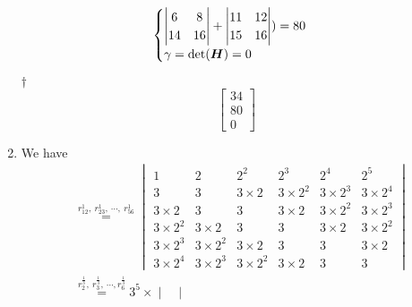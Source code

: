 \documentclass[a4paper,12pt]{article}
\begin{document}
\begin{enumerate}
\begin{equation}
\begin{aligned}
\begin{cases}
\begin{aligned}
\begin{vmatrix}
                    6 & 8 \\
                    14 & 16
                \end{vmatrix} + \begin{vmatrix}
                    11 & 12 \\
                    15 & 16
                \end{vmatrix}) = 80 \end{aligned} \\
                \gamma = \det(\boldsymbol{H}) = 0
            \end{cases}
        \end{aligned}
    \end{equation}
    \begin{answer}{$\dag$}\begin{equation}
            \begin{bmatrix}
                34 \\
                80 \\
                0
            \end{bmatrix}
        \end{equation}
    \end{answer}
    \item We have \begin{equation}
        \begin{aligned}
            & \overset{r_{12}^{1}, \ r_{23}^{1}, \ \cdots, \ r_{56}^{1}}= \begin{vmatrix}
                1 & 2 & 2^2 & 2^3 & 2^4 & 2^5 \\
                3 & 3 & 3 \times 2 & 3 \times 2^2 & 3 \times 2^3 & 3 \times 2^4 \\
                3 \times 2 & 3 & 3 & 3 \times 2 & 3 \times 2^2 & 3 \times 2^3 \\
                3 \times 2^2 & 3 \times 2 & 3 & 3 & 3 \times 2 & 3 \times 2^2 \\
                3 \times 2^3 & 3 \times 2^2 & 3 \times 2 & 3 & 3 & 3 \times 2 \\
                3 \times 2^4 & 3 \times 2^3 & 3 \times 2^2 & 3 \times 2 & 3 & 3
            \end{vmatrix} \\
            & \overset{r_{2}^{\frac{1}{3}}, \ r_{3}^{\frac{1}{3}}, \ \cdots, r_{6}^{\frac{1}{3}}}= 3^5 \times \begin{vmatrix}

\end{vmatrix}
\end{aligned}
\end{equation}
\end{enumerate}
\end{document}
